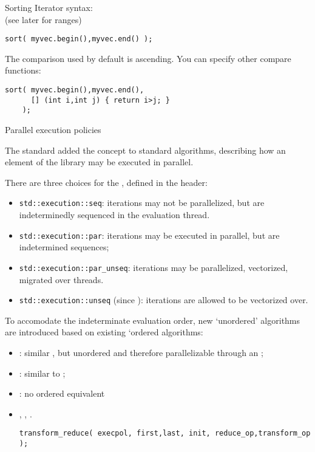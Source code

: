 \begin{slide}{Sorting}
  \label{sl:sort-it}
  Iterator syntax:\\
  (see later for ranges)
\begin{lstlisting}
sort( myvec.begin(),myvec.end() );
\end{lstlisting}
The comparison used by default is ascending.
You can specify other compare functions:
\begin{lstlisting}
sort( myvec.begin(),myvec.end(),
      [] (int i,int j) { return i>j; }
    );
\end{lstlisting}
\end{slide}

 {Parallel execution policies}

The  standard added the 
concept to standard algorithms,
describing how an element of the  library
may be executed in parallel.

There are three choices for the ,
defined in the  header:
\begin{itemize}
\item \lstinline{std::execution::seq}: iterations may not be parallelized,
  but are indeterminedly sequenced in the evaluation thread.
\item \lstinline{std::execution::par}: iterations may be executed in parallel,
  but are indetermined sequences; 
\item \lstinline{std::execution::par_unseq}: iterations may be parallelized,
  vectorized, migrated over threads.
\item \lstinline{std::execution::unseq} (since ):
  iterations are allowed to be vectorized over.
\end{itemize}

To accomodate the indeterminate evaluation order, new
`unordered' algorithms are introduced based on
existing `ordered algorithms:
\begin{itemize}
\item {}: similar , but unordered
  and therefore parallelizable through an ;
\item {}: similar to ;
\item {}: no ordered equivalent
\item {}, , .
\begin{lstlisting}
transform_reduce( execpol, first,last, init, reduce_op,transform_op );
\end{lstlisting}
\end{itemize}

